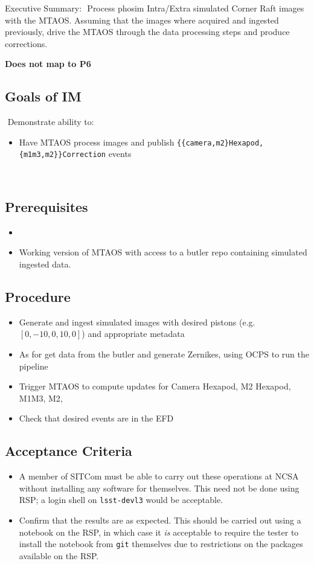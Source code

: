 
Executive Summary:
​
Process phosim Intra/Extra simulated Corner Raft images with the MTAOS.
Assuming that the images where acquired and ingested previously, drive the MTAOS through the data processing steps and produce corrections.

\textbf{Does not map to P6}
​
\subsection{Goals of IM}
​
Demonstrate ability to:
​
\begin{itemize}
\item Have MTAOS process images and publish
  \texttt{\{\{camera,m2\}Hexapod,\{m1m3,m2\}\}Correction} events
\end{itemize}
​
\subsection{Prerequisites}
\begin{itemize}
\item {}
\item Working version of MTAOS with access to a butler repo containing simulated ingested data.
\end{itemize}

\subsection{Procedure}
\begin{itemize}
\item Generate and ingest simulated images with desired pistons (e.g. $[0, -10, 0, 10, 0]$) and appropriate
  metadata
\item As for  get data from the butler and generate Zernikes, using OCPS to run the pipeline
\item Trigger MTAOS to compute updates for Camera Hexapod, M2 Hexapod, M1M3, M2, 
\item Check that desired events are in the EFD
\end{itemize}

\subsection{Acceptance Criteria}
\begin{itemize}
\item A member of SITCom must be able to carry out these operations at NCSA without installing any
  software for themselves.  This need not be done using RSP; a login shell on \eg \texttt{lsst-devl3}
  would be acceptable.
\item Confirm that the results are as expected.  This should be carried out using a notebook on the RSP,
  in which case it \textit{is} acceptable to require the tester to install the notebook from \texttt{git}
  themselves due to restrictions on the packages available on the RSP.
\end{itemize}
